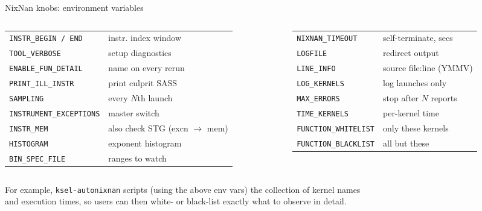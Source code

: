 \documentclass[aspectratio=169,10pt,xcolor=table]{beamer}
\begin{document}
\begin{frame}{NixNan knobs: environment variables}
\footnotesize
\begin{columns}[T]\begin{column}{0.52\textwidth}
\begin{tabular}{@{}ll@{}}
\texttt{INSTR\_BEGIN / END} & instr. index window\\[1.5mm]
\texttt{TOOL\_VERBOSE} & setup diagnostics\\[1.5mm]
\texttt{ENABLE\_FUN\_DETAIL} & name on every rerun\\[1.5mm]
\texttt{PRINT\_ILL\_INSTR} & print culprit SASS\\[1.5mm]
\texttt{SAMPLING} & every $N$th launch\\[1.5mm]
\texttt{INSTRUMENT\_EXCEPTIONS} & master switch\\[1.5mm]
\texttt{INSTR\_MEM} & also check STG (excn $\to$ mem)\\[1.5mm]
\texttt{HISTOGRAM} & exponent histogram\\[1.5mm]
\texttt{BIN\_SPEC\_FILE} & ranges to watch\\[1.5mm]
\end{tabular}
\end{column}\begin{column}{0.46\textwidth}
\begin{tabular}{@{}ll@{}}
\texttt{NIXNAN\_TIMEOUT} & self-terminate, secs\\[1.5mm]
\texttt{LOGFILE} & redirect output\\[1.5mm]
\texttt{LINE\_INFO} & source file:line (YMMV)\\[1.5mm]
\texttt{LOG\_KERNELS} & log launches only\\[1.5mm]
\texttt{MAX\_ERRORS} & stop after $N$ reports\\[1.5mm]
\texttt{TIME\_KERNELS} & per-kernel time\\[1.5mm]
\texttt{FUNCTION\_WHITELIST} & only these kernels\\[1.5mm]
\texttt{FUNCTION\_BLACKLIST} & all but these\\[1.5mm]
\end{tabular}
\end{column}\end{columns}
\vfill
{\small For example, \texttt{ksel-autonixnan} scripts (using the above env vars) the collection of kernel names\\
and execution times, so users can then white- or black-list exactly what to observe in detail.}
\end{frame}
\end{document}
